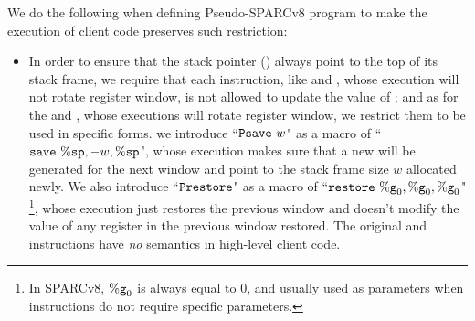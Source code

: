 We do the following when defining 
Pseudo-SPARCv8 program to make the execution 
of client code preserves such restriction:  
\begin{itemize}
    \item
    In order to ensure that 
    the stack pointer (\spreg{}) always 
    point to the top of its stack frame, we require that   
    each instruction, like \cadd{} and \ld{}, whose 
    execution will not rotate register window, 
    is not allowed to update the value of \spreg{}; 
    and as for the \csave{} and \crestore{}, whose executions 
    will rotate register window, we restrict them 
    to be used in specific forms. 
    we introduce ``$\texttt{Psave} \ w$" as a macro of 
    ``$\texttt{save}{} \ \%\texttt{sp}, -w, \%\texttt{sp}$", 
    whose execution makes sure that a new \spreg{} 
    will be generated for the next window
    and point to the stack frame size $w$ allocated newly. 
    We also introduce ``$\texttt{Prestore}$" 
    as a macro of ``$\texttt{restore}{} \ \%\texttt{g}_{0}, \%\texttt{g}_{0}, \%\texttt{g}_{0}$"
    \footnote{In SPARCv8, $\%\texttt{g}_{0}$ is always equal to 0, 
    and usually used as parameters when instructions do not 
    require specific parameters.},  
    whose execution just restores the previous window 
    and doesn't modify the value of any register 
    in the previous window restored. 
    The original \csave{} and \crestore{} instructions 
    have \textit{no} semantics in high-level client code.   
    

\end{itemize}
